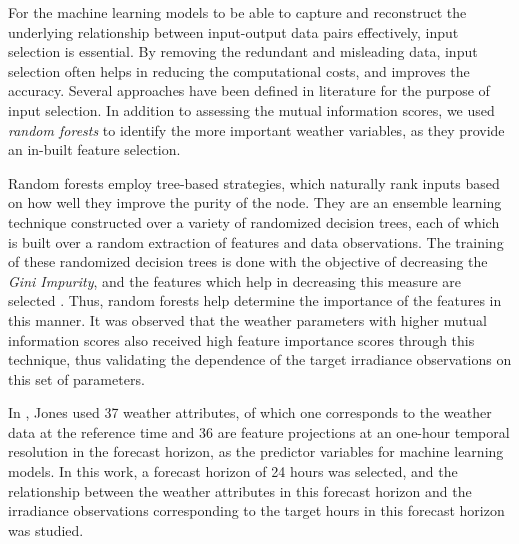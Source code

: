 \par For the machine learning models to be able to capture and reconstruct the underlying relationship between input-output data pairs effectively, input selection is essential. By removing the redundant and misleading data, input selection often helps in reducing the computational costs, and improves the accuracy. Several approaches have been defined in literature for the purpose of input selection. In addition to assessing the mutual information scores, we used \textit{random forests} to identify the more important weather variables, as they provide an in-built feature selection.

\par Random forests employ tree-based strategies, which naturally rank inputs based on how well they improve the purity of the node. They are an ensemble learning technique constructed over a variety of randomized decision trees, each of which is built over a random extraction of features and data observations. The training of these randomized decision trees is done with the objective of decreasing the \textit{Gini Impurity}, and the features which help in decreasing this measure are selected \cite{feature_selection_rf}. Thus, random forests help determine the importance of the features in this manner. It was observed that the weather parameters with higher mutual information scores also received high feature importance scores through this technique, thus validating the dependence of the target irradiance observations on this set of parameters.

\par In \cite{thesis_zach}, Jones used 37 weather attributes, of which one corresponds to the weather data at the reference time and 36 are feature projections at an one-hour temporal resolution in the forecast horizon, as the predictor variables for machine learning models. In this work, a forecast horizon of 24 hours was selected, and the relationship between the weather attributes in this forecast horizon and the irradiance observations corresponding to the target hours in this forecast horizon was studied. 

